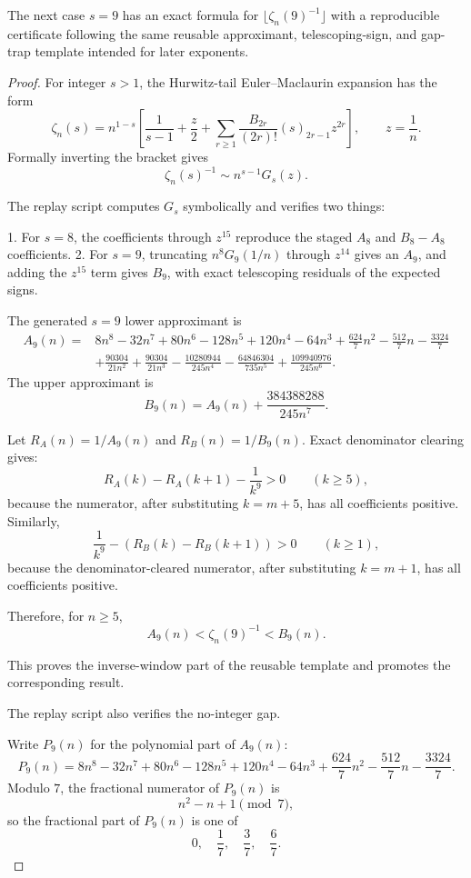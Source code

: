 \begin{proposition}[s=9 inverse zeta tail floor formula with reusable certificate template]
\label{res:zeta-tail-s9-reusable-certificate}
The next case \(s=9\) has an exact formula for \(\lfloor\zeta_n(9)^{-1}\rfloor\) with a reproducible certificate following the same reusable approximant, telescoping-sign, and gap-trap template intended for later exponents.
\end{proposition}
\begin{proof}
For integer \(s>1\), the Hurwitz-tail Euler--Maclaurin expansion has the form
\[
\zeta_n(s)
=n^{1-s}\left[
\frac1{s-1}+\frac{z}{2}
+\sum_{r\ge1}\frac{B_{2r}}{(2r)!}(s)_{2r-1}z^{2r}
\right],
\qquad z=\frac1n.
\]
Formally inverting the bracket gives
\[
\zeta_n(s)^{-1}\sim n^{s-1}G_s(z).
\]

The replay script
computes \(G_s\) symbolically and verifies two things:

1. For \(s=8\), the coefficients through \(z^{15}\) reproduce the staged \(A_8\) and \(B_8-A_8\) coefficients.
2. For \(s=9\), truncating \(n^8G_9(1/n)\) through \(z^{14}\) gives an \(A_9\), and adding the \(z^{15}\) term gives \(B_9\), with exact telescoping residuals of the expected signs.

The generated \(s=9\) lower approximant is
\[
\begin{aligned}
A_9(n)=&8n^8-32n^7+80n^6-128n^5+120n^4-64n^3
+\frac{624}{7}n^2-\frac{512}{7}n-\frac{3324}{7}\\
&+\frac{90304}{21n^2}+\frac{90304}{21n^3}
-\frac{10280944}{245n^4}-\frac{64846304}{735n^5}
+\frac{109940976}{245n^6}.
\end{aligned}
\]
The upper approximant is
\[
B_9(n)=A_9(n)+\frac{384388288}{245n^7}.
\]

Let \(R_A(n)=1/A_9(n)\) and \(R_B(n)=1/B_9(n)\). Exact denominator clearing gives:
\[
R_A(k)-R_A(k+1)-\frac1{k^9}>0
\qquad(k\ge5),
\]
because the numerator, after substituting \(k=m+5\), has all coefficients positive. Similarly,
\[
\frac1{k^9}-\left(R_B(k)-R_B(k+1)\right)>0
\qquad(k\ge1),
\]
because the denominator-cleared numerator, after substituting \(k=m+1\), has all coefficients positive.

Therefore, for \(n\ge5\),
\[
A_9(n)<\zeta_n(9)^{-1}<B_9(n).
\]

This proves the inverse-window part of the reusable template and promotes the corresponding result.

The replay script also verifies the no-integer gap.

Write \(P_9(n)\) for the polynomial part of \(A_9(n)\):
\[
P_9(n)=8n^8-32n^7+80n^6-128n^5+120n^4-64n^3
+\frac{624}{7}n^2-\frac{512}{7}n-\frac{3324}{7}.
\]
Modulo \(7\), the fractional numerator of \(P_9(n)\) is
\[
n^2-n+1\pmod 7,
\]
so the fractional part of \(P_9(n)\) is one of
\[
0,\quad \frac17,\quad \frac37,\quad \frac67.
\]


\end{proof}
